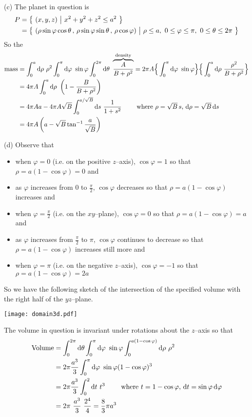 \begin{solution}
(c) The planet in question is
\begin{align*}
P&=\big\{ \ (x,y,z)\ \big|\ x^2+y^2+z^2\le a^2\ \big\} \\
 &=\big\{ \ (\rho\sin\varphi\cos\theta\,,\,
         \rho\sin\varphi\sin\theta\,,\,
         \rho\cos\varphi)\ \big|\ \rho\le a,\ 0\le\varphi\le\pi,
             \ 0\le\theta\le2\pi\ \big\} 
\end{align*}
So the
\begin{align*}
\text{mass}
&= \int_{0}^{a}\mathrm{d}\rho\ \rho^2 \int_0^{\pi}\mathrm{d}\varphi\ \sin\varphi
\int_{0}^{2\pi} \mathrm{d}\theta\ \overbrace{\frac{A}{B+\rho^2}}^{\rm density}
=2\pi A\Big\{ \int_0^{\pi}\mathrm{d}\varphi\ \sin\varphi\Big\}
\Big\{\int_{0}^{a}\mathrm{d}\rho\ \frac{\rho^2}{B+\rho^2} \Big\} \\
&=4\pi A\int_{0}^{a}\mathrm{d}\rho\ \left(1-\frac{B}{B+\rho^2} \right) \\
&=4\pi Aa-4\pi A\sqrt{B}\int_{0}^{a/\sqrt{B}}\mathrm{d}s\ \frac{1}{1+s^2} 
\qquad\hbox{ where $\rho=\sqrt{B}\,s$,
$\mathrm{d}\rho=\sqrt{B}\,\mathrm{d}s$} \\
&=4\pi A\left(a-\sqrt{B}\tan^{-1}\frac{a}{\sqrt{B}}\right)
\end{align*}

(d)  Observe that
\begin{itemize}
\item
when $\varphi=0$ (i.e. on the positive $z$--axis), $\cos\varphi=1$ so that
        $\rho=a(1-\cos\varphi)=0$ and
\item
as $\varphi$ increases from $0$ to $\frac{\pi}{2}$, $\cos\varphi$ decreases
         so that $\rho=a(1-\cos\varphi)$ increases and
\item
when $\varphi=\frac{\pi}{2}$ (i.e. on the $xy$--plane), $\cos\varphi=0$ so that
       $\rho=a(1-\cos\varphi)=a$ and
\item
as $\varphi$ increases from  $\frac{\pi}{2}$ to $\pi$, $\cos\varphi$
      continues to decrease so that
          $\rho=a(1-\cos\varphi)$ increases still more and
\item
when $\varphi=\pi$ (i.e. on the negative $z$--axis), $\cos\varphi=-1$ so that
        $\rho=a(1-\cos\varphi)=2a$
\end{itemize}
So we have the following sketch of the intersection of the specified 
volume with the right half of the $yz$--plane.
\begin{center}
     \texttt{[image: domain3d.pdf]}
\end{center}
The volume in question is invariant under rotations about
the $z$--axis so that
\begin{align*}
\text{Volume}
&= \int_{0}^{2\pi} \mathrm{d}\theta\int_0^{\pi}\mathrm{d}\varphi\ \sin\varphi\int_{0}^{a(1-\cos\varphi)}\mathrm{d}\rho\ \rho^2 
\\
&=2\pi\frac{a^3}{3} \int_0^{\pi}\mathrm{d}\varphi\ \sin\varphi(1-\cos\varphi)^3 \\
&=2\pi\frac{a^3}{3} \int_0^2\mathrm{d}t\ t^3
\qquad\hbox{ where $t=1-\cos\varphi$, $\mathrm{d}t=\sin\varphi\,\mathrm{d}\varphi$} \\
&=2\pi\ \frac{a^3}{3}\ \frac{2^4}{4}
=\frac{8}{3}\pi a^3
\end{align*}
\end{solution}


